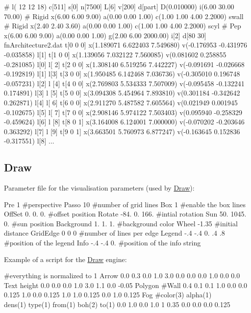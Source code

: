 \begin{DoxyCode}
# l( 12 12 18) c[511] s[0] n[7500] L[6] v[200] d[part] D(0.010000) i(6.00 30.00
       70.00) 
# Rigid x(6.00 6.00 9.00) a(0.00 0.00 1.00) c(1.00 1.00 4.00 2.2000) s{wall}
# Rigid x(2.40 2.40 3.60) a(0.00 0.00 1.00) c(1.00 1.00 4.00 2.2000) s{cyl}
# Pep x(6.00 6.00 9.00) a(0.00 0.00 1.00) g(2.00 6.00 2000.00) i[2] d[80 30]
       fn{Architecture2.dat}
{ t[0 0 0] x(1.189071 6.622403 7.549680) v(-0.176953 -0.431976 -0.035858) l[1] 
      }
{ t[1 0 0] x(1.139056 7.032122 7.560085) v(0.081602 0.258855 -0.281085) l[0] l[
      2] }
{ t[2 0 0] x(1.308140 6.519256 7.442227) v(-0.091691 -0.026668 -0.192819) l[1] 
      l[3] }
{ t[3 0 0] x(1.950485 6.142468 7.036736) v(-0.305010 0.196748 -0.057231) l[2] l
      [4] }
{ t[4 0 0] x(2.769803 5.534333 7.507009) v(-0.095458 -0.132241 0.174891) l[3] l
      [5] }
{ t[5 0 0] x(3.094308 5.454964 7.893810) v(0.301184 -0.342642 0.262871) l[4] l[
      6] }
{ t[6 0 0] x(2.911270 5.487582 7.605564) v(0.021949 0.001945 -0.102675) l[5] l[
      7] }
{ t[7 0 0] x(2.908146 5.974122 7.503403) v(0.095940 -0.258329 -0.459624) l[6] l
      [8] }
{ t[8 0 1] x(3.164008 6.124001 7.000000) v(-0.070202 -0.203646 0.363292) l[7] l
      [9] }
{ t[9 0 1] x(3.663501 5.760973 6.877247) v(-0.163645 0.152836 -0.317551) l[8] }
...
\end{DoxyCode}
\hypertarget{param_page_Draw_section}{}\subsection{\-Draw}\label{param_page_Draw_section}
\-Parameter file for the visualisation parameters (used by \hyperlink{classDraw}{\-Draw})\-: 
\begin{DoxyCode}
Pre           1                    #perspective
Passo         10                   #number of grid lines
Box           1                    #enable the box lines
OffSet        0. 0. 0.             #offset position
Rotate        -84. 0. 166.         #intial rotation
Sun           50. 1045. 0.         #sun position
Background    1. 1. 1.             #background color
Wheel         -1.35                #initial distance
GridEdge      0 0 0                #number of lines per edge
Legend        -.4 -.4 0. .4 .8     #position of the legend
Info          -.4 -.4 0.           #position of the info string
\end{DoxyCode}
 \-Example of a script for the \hyperlink{classDraw}{\-Draw} engine\-: 
\begin{DoxyCode}
#everything is normalized to 1
Arrow
0.0 0.3 0.0 1.0 3.0
0.0 0.0 0.0 1.0 0.0 0.0
Text
height
0.0 0.0 0.0 1.0 3.0
1.1 0.0 -0.05
Polygon #Wall
0.4 0.1 0.1 1.0
0.0 0.0 0.125
1.0 0.0 0.125
1.0 1.0 0.125
0.0 1.0 0.125
Fog #color(3) alpha(1) \\ dens(1) type(1) from(1) boh(2) to(1)
0.0 1.0 0.0 1.0
1 0.35 0.0 0.0 0.0 0.125
\end{DoxyCode}
